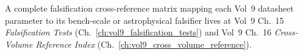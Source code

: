 \noindent
A complete falsification cross-reference matrix mapping each Vol~9 datasheet parameter to its bench-scale or astrophysical falsifier lives at Vol~9 Ch.~15 \emph{Falsification Tests} (Ch.~\ref{ch:vol9_falsification_tests}) and Vol~9 Ch.~16 \emph{Cross-Volume Reference Index} (Ch.~\ref{ch:vol9_cross_volume_reference}).
%
%
